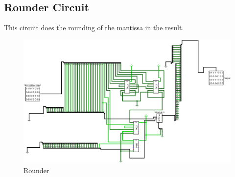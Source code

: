 \documentclass[12pt]{article}
\begin{document}
\newpage
\subsection{Rounder Circuit}
This circuit does the rounding of the mantissa in the result.
\begin{figure}[H]
    \centering
        \includegraphics[width=\textwidth]{images/Rounder.jpg}
    \caption{Rounder}\label{fig:rounder}
\end{figure}

\vspace{2cm}
\end{document}
